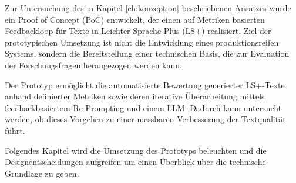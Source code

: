 
Zur Untersuchung des in Kapitel \ref{ch:konzeption} beschriebenen Ansatzes wurde ein Proof of Concept (PoC) entwickelt, der einen auf Metriken basierten Feedbackloop für Texte in Leichter Sprache Plus (LS+) realisiert.
Ziel der prototypischen Umsetzung ist nicht die Entwicklung eines produktionsreifen Systems, sondern die Bereitstellung einer technischen Basis, die zur Evaluation der Forschungsfragen herangezogen werden kann.

Der Prototyp ermöglicht die automatisierte Bewertung generierter LS+-Texte anhand definierter Metriken sowie deren iterative Überarbeitung mittels feedbackbasiertem Re-Prompting und einem LLM.
Dadurch kann untersucht werden, ob dieses Vorgehen zu einer messbaren Verbesserung der Textqualität führt.

Folgendes Kapitel wird die Umsetzung des Prototyps beleuchten und die Designentscheidungen aufgreifen um einen Überblick über die technische Grundlage zu geben.